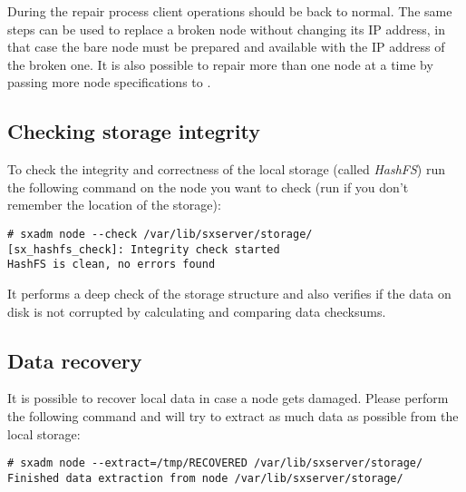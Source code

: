During the repair process client operations should be back to normal. The same
steps can be used to replace a broken node without changing its IP address, in
that case the bare node must be prepared and available with the IP address of
the broken one. It is also possible to repair more than one node at a time by
passing more node specifications to .

\subsection{Checking storage integrity}
To check the integrity and correctness of the local storage (called
\emph{HashFS}) run the following command on the node you want to check (run
 if you don't remember the location of the storage):
\begin{lstlisting}
# sxadm node --check /var/lib/sxserver/storage/
[sx_hashfs_check]: Integrity check started   
HashFS is clean, no errors found
\end{lstlisting}
It performs a deep check of the storage structure and also verifies if the
data on disk is not corrupted by calculating and comparing data checksums.

\subsection{Data recovery}
It is possible to recover local data in case a node gets damaged. Please
perform the following command and  will try to extract as
much data as possible from the local storage:
\begin{lstlisting}
# sxadm node --extract=/tmp/RECOVERED /var/lib/sxserver/storage/
Finished data extraction from node /var/lib/sxserver/storage/
\end{lstlisting}
